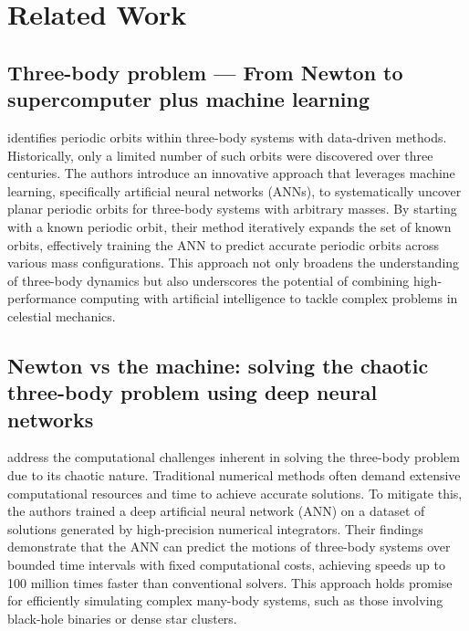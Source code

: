 \documentclass[draft]{agujournal2019}
\begin{document}
\section{Related Work}
\subsection{Three-body problem — From Newton to supercomputer plus machine learning}
\cite{Liao_2022} identifies periodic orbits within three-body systems with data-driven methods. Historically, only a limited number of such orbits were discovered over three centuries. The authors introduce an innovative approach that leverages machine learning, specifically artificial neural networks (ANNs), to systematically uncover planar periodic orbits for three-body systems with arbitrary masses. By starting with a known periodic orbit, their method iteratively expands the set of known orbits, effectively training the ANN to predict accurate periodic orbits across various mass configurations. This approach not only broadens the understanding of three-body dynamics but also underscores the potential of combining high-performance computing with artificial intelligence to tackle complex problems in celestial mechanics.
\subsection{Newton vs the machine: solving the chaotic three-body problem using deep neural networks}
\cite{Breen_2020} address the computational challenges inherent in solving the three-body problem due to its chaotic nature. Traditional numerical methods often demand extensive computational resources and time to achieve accurate solutions. To mitigate this, the authors trained a deep artificial neural network (ANN) on a dataset of solutions generated by high-precision numerical integrators. Their findings demonstrate that the ANN can predict the motions of three-body systems over bounded time intervals with fixed computational costs, achieving speeds up to 100 million times faster than conventional solvers. This approach holds promise for efficiently simulating complex many-body systems, such as those involving black-hole binaries or dense star clusters.
\end{document}

